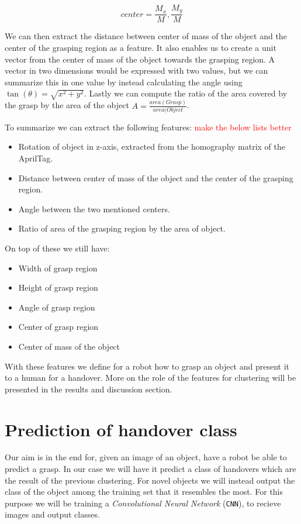 \[
	center = \frac{M_x}{M}, \frac{M_y}{M}
\]

We can then extract the distance between center of mass of the object and the center of the grasping region as a feature. It also enables us to create a unit vector from the center of mass of the object towards the grasping region. A vector in two dimensions would be expressed with two values, but we can summarize this in one value by instead calculating the angle using \(\tan(\theta) = \sqrt{x^2 + y^2}\). Lastly we can compute the ratio of the area covered by the grasp by the area of the object \(A = \frac{area(Grasp)}{area(Object}\).

To summarize we can extract the following features: \textcolor{red}{make the below lists better}
\begin{itemize}
	\item Rotation of object in z-axis, extracted from the homography matrix of the AprilTag.
	\item Distance between center of mass of the object and the center of the grasping region.
	\item Angle between the two mentioned centers.
	\item Ratio of area of the grasping region by the area of object.
\end{itemize}

On top of these we still have:
\begin{itemize}
	\item Width of grasp region
	\item Height of grasp region
	\item Angle of grasp region
	\item Center of grasp region
	\item Center of mass of the object
\end{itemize}

With these features we define for a robot how to grasp an object and present it to a human for a handover. More on the role of the features for clustering will be presented in the results and discussion section.


\section{Prediction of handover class}

Our aim is in the end for, given an image of an object, have a robot be able to predict a grasp. In our case we will have it predict a class of handovers which are the result of the previous clustering. For novel objects we will instead output the class of the object among the training set that it resembles the most. For this purpose we will be training a \emph{Convolutional Neural Network} (\texttt{CNN}), to recieve images and output classes.

